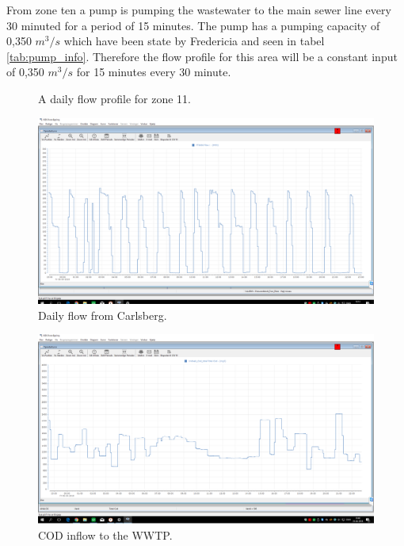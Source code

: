 From zone ten a pump is pumping the wastewater to the main sewer line every 30 minuted for a period of 15 minutes. The pump has a pumping capacity of 0,350 $m^3/s$ which have been state by Fredericia and seen in tabel \ref{tab:pump_info}. Therefore the flow profile for this area will be a constant input of 0,350 $m^3/s$ for 15 minutes every 30 minute. 

\begin{figure}[H]
\centering

\caption{A daily flow profile for zone 11.}
\label{fig:APP_flow_profile_zone11}
\end{figure} 


\begin{figure}[H]
	\centering
	\includegraphics[width=0.95\textheight, angle=-90]{report/appendix/figures/Carlsberg_data.png}
	\caption{Daily flow from Carlsberg.}
	\label{fig:Carlsberg_data}
\end{figure}

\begin{figure}[H]
	\centering
	\includegraphics[width=0.95\textheight, angle=-90]{report/appendix/figures/COD_data.png}
	\caption{COD inflow to the WWTP.}
	\label{fig:COD_data}
\end{figure}


